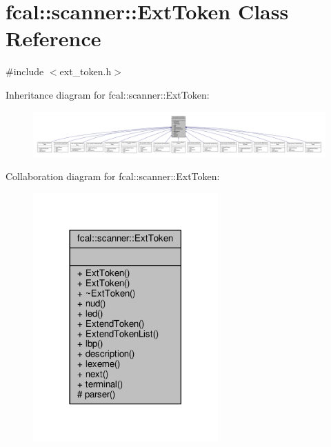 \hypertarget{classfcal_1_1scanner_1_1ExtToken}{}\section{fcal\+:\+:scanner\+:\+:Ext\+Token Class Reference}
\label{classfcal_1_1scanner_1_1ExtToken}


{\ttfamily \#include $<$ext\+\_\+token.\+h$>$}



Inheritance diagram for fcal\+:\+:scanner\+:\+:Ext\+Token\+:
\nopagebreak
\begin{figure}[H]
\begin{center}
\leavevmode
\includegraphics[width=350pt]{classfcal_1_1scanner_1_1ExtToken__inherit__graph}
\end{center}
\end{figure}


Collaboration diagram for fcal\+:\+:scanner\+:\+:Ext\+Token\+:
\nopagebreak
\begin{figure}[H]
\begin{center}
\leavevmode
\includegraphics[width=201pt]{classfcal_1_1scanner_1_1ExtToken__coll__graph}
\end{center}
\end{figure}
